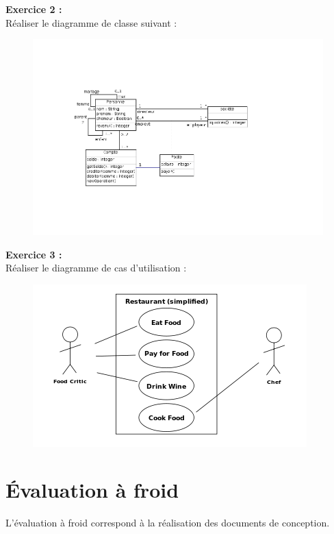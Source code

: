 \documentclass[asi, sansVersion]{picInsa}
\begin{document}
		\textbf{Exercice 2 :}\\
		Réaliser le diagramme de classe suivant : \\
		\begin{figure}[H]
			\centering
			\includegraphics[scale=0.5]{images/diagrammeDeClasse.png}
		\end{figure}
		
		\textbf{Exercice 3 :}\\
		Réaliser le diagramme de cas d'utilisation : \\
		\begin{figure}[H]
			\centering
		\includegraphics[scale=1]{images/diagrammeDeCasDUtilisation.png}
		\end{figure}
			
			\vspace{8px}
			
			
	\newpage
	\section*{Évaluation à froid}
		L'évaluation à froid correspond à la réalisation des documents de conception.
\end{document}
